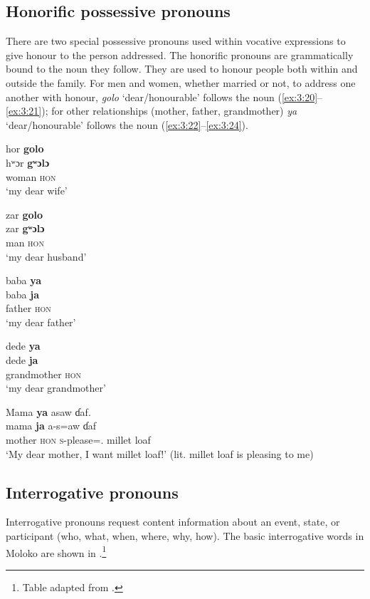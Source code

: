 \subsection{Honorific possessive pronouns}\label{sec:3.1.3}
\hypertarget{RefHeading1210881525720847}{}
There are two special possessive pronouns used within vocative expressions to give honour to the person addressed.  The honorific pronouns are grammatically bound to the noun they follow.  They are used to honour people both within and outside the family. For men and women, whether married or not, to address one another with honour, \textit{golo} ‘dear/honourable’ follows the noun (\ref{ex:3:20}--\ref{ex:3:21}); for other relationships (mother, father, grandmother)  \textit{ya} ‘dear/honourable’ follows the noun (\ref{ex:3:22}--\ref{ex:3:24}). 

\clearpage
\ea \label{ex:3:20}
hor  \textbf{golo} \\
\gll  hʷɔr \textbf{gʷɔlɔ}\\
      woman  \textsc{hon}\\
\glt  `my dear wife'
\z

\ea \label{ex:3:21}
zar  \textbf{golo}\\
\gll  zar     \textbf{gʷɔlɔ} \\
      man    \textsc{hon}\\
\glt  `my dear husband'
\z

\ea \label{ex:3:22}
baba  \textbf{ya} \\
\gll  baba  \textbf{ja}\\
      father  \textsc{hon}\\
\glt  `my dear father'
\z

\ea \label{ex:3:23}
 dede  \textbf{ya}\\
 \gll  dede  \textbf{ja}\\
      grandmother  \textsc{hon}\\
\glt  `my dear grandmother'
\z

\ea \label{ex:3:24}
Mama  \textbf{ya}  asaw  ɗaf.\\
\gll  mama  \textbf{ja}     a-s=aw      ɗaf\\
      mother  \textsc{hon}  \textsc{s}-please={\oneS}.{\IO}    {millet loaf}\\
\glt  `My dear mother, I want millet loaf!' (lit. millet loaf is pleasing to me)
\z

\subsection{Interrogative pronouns}\label{sec:3.1.4}
\hypertarget{RefHeading1210901525720847}{}
Interrogative pronouns request content information about an event, state, or participant (who, what, when, where, why, how). The basic interrogative words in Moloko are shown in .\footnote{Table adapted from \citet{Boyd2003}.} 

